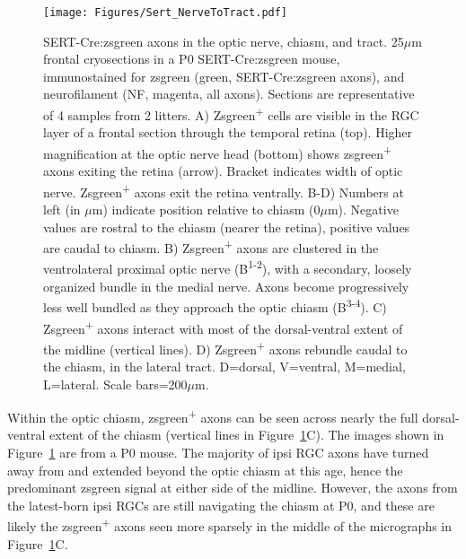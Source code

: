 \begin{figure}[hbtp]
    \begin{center}
        \texttt{[image: Figures/Sert\_NerveToTract.pdf]}
        \caption[SERT-Cre:zsgreen axons in the optic nerve, chiasm, and tract.]
        {SERT-Cre:zsgreen axons in the optic nerve, chiasm, and tract.
        25$\mu$m frontal cryosections in a P0 SERT-Cre:zsgreen mouse, immunostained for zsgreen (green, SERT-Cre:zsgreen axons), and neurofilament (NF, magenta, all axons).
        Sections are representative of 4 samples from 2 litters. %
        A) Zsgreen\textsuperscript{+} cells are visible in the RGC layer of a frontal section through the temporal retina (top).
        Higher magnification at the optic nerve head (bottom) shows zsgreen\textsuperscript{+} axons exiting the retina (arrow).
        Bracket indicates width of optic nerve.
		Zsgreen\textsuperscript{+} axons exit the retina ventrally.
        B-D) Numbers at left (in $\mu$m) indicate position relative to chiasm (0$\mu$m).
        Negative values are rostral to the chiasm (nearer the retina), positive values are caudal to chiasm.
        B) Zsgreen\textsuperscript{+} axons are clustered in the ventrolateral proximal optic nerve (B\textsuperscript{1-2}), with a secondary, loosely organized bundle in the medial nerve.
        Axons become progressively less well bundled as they approach the optic chiasm (B\textsuperscript{3-4}).
        C) Zsgreen\textsuperscript{+} axons interact with most of the dorsal-ventral extent of the midline (vertical lines).
        D) Zsgreen\textsuperscript{+} axons rebundle caudal to the chiasm, in the lateral tract.
        D=dorsal, V=ventral, M=medial, L=lateral.
        Scale bars=200$\mu$m.}
        \label{Figures/SertNerveToTract}
    \end{center}
\end{figure}

Within the optic chiasm, zsgreen\textsuperscript{+} axons can be seen across nearly the full dorsal-ventral extent of the chiasm (vertical lines in Figure~\ref{Figures/SertNerveToTract}C).
The images shown in Figure~\ref{Figures/SertNerveToTract} are from a P0 mouse.
The majority of ipsi RGC axons have turned away from and extended beyond the optic chiasm at this age, hence the predominant zsgreen signal at either side of the midline.
However, the axons from the latest-born ipsi RGCs are still navigating the chiasm at P0, and these are likely the zsgreen\textsuperscript{+} axons seen more sparsely in the middle of the micrographs in Figure~\ref{Figures/SertNerveToTract}C.

